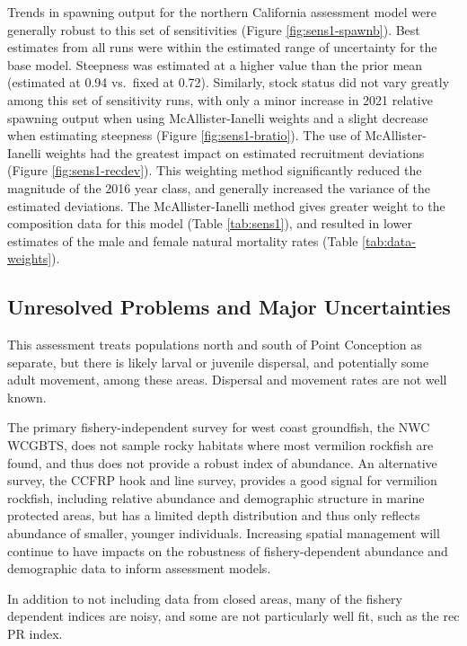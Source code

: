 \documentclass[
  english,
  a4paper,
]{article}
\begin{document}
Trends in spawning output for the northern California assessment model were generally robust to this set of sensitivities (Figure \ref{fig:sens1-spawnb}). Best estimates from all runs were within the estimated range of uncertainty for the base model. Steepness was estimated at a higher value than the prior mean (estimated at 0.94 vs.~fixed at 0.72). Similarly, stock status did not vary greatly among this set of sensitivity runs, with only a minor increase in 2021 relative spawning output when using McAllister-Ianelli weights and a slight decrease when estimating steepness (Figure \ref{fig:sens1-bratio}). The use of McAllister-Ianelli weights had the greatest impact on estimated recruitment deviations (Figure \ref{fig:sens1-recdev}). This weighting method significantly reduced the magnitude of the 2016 year class, and generally increased the variance of the estimated deviations. The McAllister-Ianelli method gives greater weight to the composition data for this model (Table \ref{tab:sens1}), and resulted in lower estimates of the male and female natural mortality rates (Table \ref{tab:data-weights}).

\hypertarget{unresolved-problems-and-major-uncertainties-1}{%
\subsection{Unresolved Problems and Major Uncertainties}\label{unresolved-problems-and-major-uncertainties-1}}

This assessment treats populations north and south of Point Conception as separate, but there is likely larval or juvenile dispersal, and potentially some adult movement, among these areas. Dispersal and movement rates are not well known.

The primary fishery-independent survey for west coast groundfish, the NWC WCGBTS, does not sample rocky habitats where most vermilion rockfish are found, and thus does not provide a robust index of abundance. An alternative survey, the CCFRP hook and line survey, provides a good signal for vermilion rockfish, including relative abundance and demographic structure in marine protected areas, but has a limited depth distribution and thus only reflects abundance of smaller, younger individuals. Increasing spatial management will continue to have impacts on the robustness of fishery-dependent abundance and demographic data to inform assessment models.

In addition to not including data from closed areas, many of the fishery dependent indices are noisy, and some are not particularly well fit, such as the rec PR index.
\end{document}
